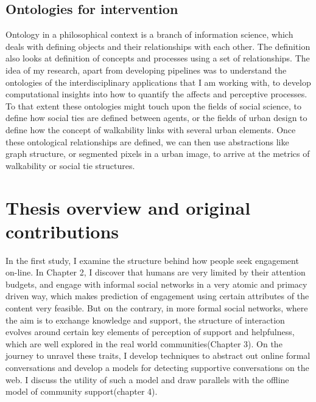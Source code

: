 \subsection{Ontologies for intervention}
Ontology in a philosophical context is a branch of information science, which deals with defining objects and their relationships with each other. The definition also looks at definition of concepts and processes using a set of relationships. The idea of my research, apart from developing pipelines was to understand the ontologies of the interdisciplinary applications that I am working with, to develop computational insights into how to quantify the affects and perceptive processes. To that extent these ontologies might touch upon the fields of social science, to define how social ties are defined between agents, or the fields of urban design to define how the concept of walkability links with several urban elements. Once these ontological relationships are defined, we can then use abstractions like graph structure, or segmented pixels in a urban image, to arrive at the metrics of walkability or social tie structures.



\section{Thesis overview and original contributions}

In the first study, I examine the structure behind how people seek engagement on-line. In Chapter 2, I discover that humans are very limited by their attention budgets, and engage with informal social networks in a very atomic and primacy driven way, which makes prediction of engagement using certain attributes of the content very feasible. But on the contrary, in more formal social networks, where the aim is to exchange knowledge and support, the structure of interaction evolves around certain key elements of perception of support and helpfulness, which are well explored in the real world communities(Chapter 3). On the journey to unravel these traits, I develop techniques to abstract out online formal conversations and develop a models for detecting supportive conversations on the web. I discuss the utility of such a model and draw parallels with the offline model of community support(chapter 4). 

